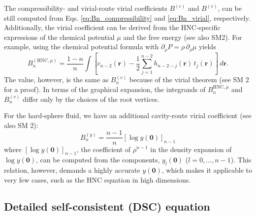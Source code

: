 \documentclass[aip,jcp,preprint,superscriptaddress,showpacs,preprintnumbers,amsmath,amssymb]{revtex4-1}
\newcommand{\vct}[1]{\mathbf{#1}}
\providecommand{\vr}{} %
\renewcommand{\vr}{\vct{r}}
\begin{document}
The compressibility- and virial-route virial coefficients
$B^{(c)}$ and $B^{(v)}$,
can be still computed from
Eqs. \eqref{eq:Bn_compressibility}
and
\eqref{eq:Bn_virial}, respectively.
%
Additionally,
the virial coefficient
can be derived from the HNC-specific expressions
of the chemical potential $\mu$
and the free energy\cite{
morita1958, *morita1959, morita1960,
morita1960I, morita1961III,
singer1985}
(see also SM2).
%
For example,
using the chemical potential formula with
$\partial_\rho P = \rho \, \partial_\rho \mu$ yields
%
\[
B_n^{(\mathrm{HNC}, \mu)}
=
\frac{1-n}{n}
\int
\left[
  c_{n-2}(\vr)
  -\frac{1}{2} \sum_{j=1}^{n-2} h_{n-2-j}(\vr) \, t_j(\vr)
\right] \, d\vr.
\]
%
The value, however,
is the same as $B_n^{(v)}$\cite{
morita1960, morita1960I}
because of the virial theorem\cite{rushbrooke1953, uhlenbeck1962}
(see SM 2 for a proof).
%
In terms of the graphical expansion\cite{
hansen, uhlenbeck1962, morita1961III},
the integrands of
$B_n^{\mathrm{HNC}, \mu}$
and
$B_n^{(v)}$
differ only by the choices of the root vertices.



For the hard-sphere fluid,
we have an additional cavity-route virial coefficient\cite{hoover1962}
(see also SM 2):
%
\begin{equation}
B_n^{(y)}
=
\frac{n - 1}{n}
\left[
  \log y(\vct 0)
\right]_{n - 1}
\label{eq:Bn_cavity}
\end{equation}
%
where
$[ \log y(\vct 0) ]_{n - 1}$,
the coefficient of $\rho^{n-1}$
in the density expansion of $\log y(\vct 0)$,
can be computed from the components,
$y_l(\vct 0)$ ($l = 0, \dots, n - 1$).
%
This relation,
however,
demands a highly accurate $y(\vct 0)$,
which makes it applicable to very few cases,
such as the HNC equation in high dimensions.





\subsection{\label{sec:selfconsistent}
Detailed self-consistent (DSC) equation}
\end{document}
